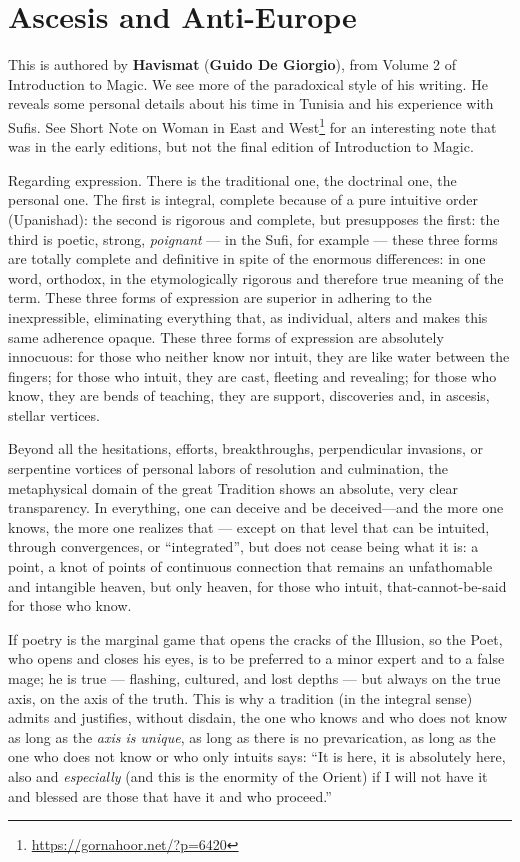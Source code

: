 \section{Ascesis and Anti-Europe}

\begin{quotex}
This is authored by \textbf{Havismat} (\textbf{Guido De Giorgio}), from Volume 2 of Introduction to Magic. We see more of the paradoxical style of his writing. He reveals some personal details about his time in Tunisia and his experience with Sufis. See Short Note on Woman in East and West\footnote{\url{https://gornahoor.net/?p=6420}} for an interesting note that was in the early editions, but not the final edition of Introduction to Magic.
\end{quotex}

Regarding expression. There is the traditional one, the doctrinal one, the personal one. The first is integral, complete because of a pure intuitive order (Upanishad): the second is rigorous and complete, but presupposes the first: the third is poetic, strong, \emph{poignant} --- in the Sufi, for example --- these three forms are totally complete and definitive in spite of the enormous differences: in one word, orthodox, in the etymologically rigorous and therefore true meaning of the term. These three forms of expression are superior in adhering to the inexpressible, eliminating everything that, as individual, alters and makes this same adherence opaque. These three forms of expression are absolutely innocuous: for those who neither know nor intuit, they are like water between the fingers; for those who intuit, they are cast, fleeting and revealing; for those who know, they are bends of teaching, they are support, discoveries and, in ascesis, stellar vertices.

Beyond all the hesitations, efforts, breakthroughs, perpendicular invasions, or serpentine vortices of personal labors of resolution and culmination, the metaphysical domain of the great Tradition shows an absolute, very clear transparency. In everything, one can deceive and be deceived---and the more one knows, the more one realizes that --- except on that level that can be intuited, through convergences, or ``integrated'', but does not cease being what it is: a point, a knot of points of continuous connection that remains an unfathomable and intangible heaven, but only heaven, for those who intuit, that-cannot-be-said for those who know.

If poetry is the marginal game that opens the cracks of the Illusion, so the Poet, who opens and closes his eyes, is to be preferred to a minor expert and to a false mage; he is true --- flashing, cultured, and lost depths --- but always on the true axis, on the axis of the truth. This is why a tradition (in the integral sense) admits and justifies, without disdain, the one who knows and who does not know as long as the \emph{axis is unique}, as long as there is no prevarication, as long as the one who does not know or who only intuits says: ``It is here, it is absolutely here, also and \emph{especially} (and this is the enormity of the Orient) if I will not have it and blessed are those that have it and who proceed.''

